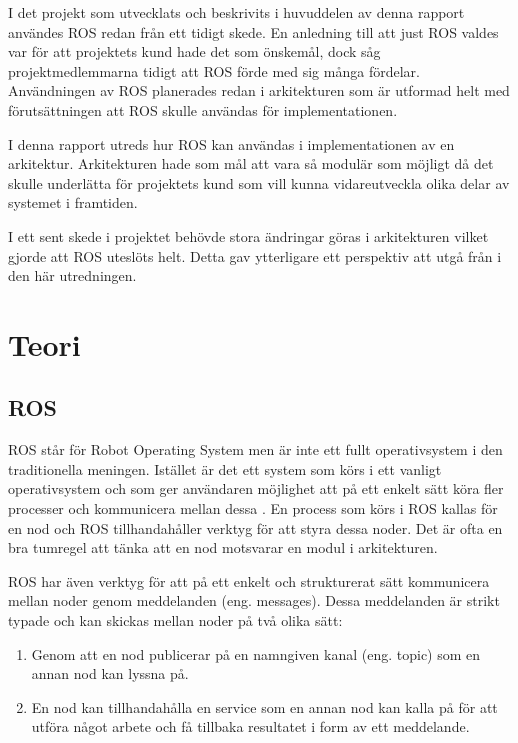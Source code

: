 I det projekt som utvecklats och beskrivits i huvuddelen av denna rapport användes ROS redan från ett tidigt skede. En anledning till att just ROS valdes var för att projektets kund hade det som önskemål, dock såg projektmedlemmarna tidigt att ROS förde med sig många fördelar. Användningen av ROS planerades redan i arkitekturen som är utformad helt med förutsättningen att ROS skulle användas för implementationen.

I denna rapport utreds hur ROS kan användas i implementationen av en arkitektur. Arkitekturen hade som mål att vara så modulär som möjligt då det skulle underlätta för projektets kund som vill kunna vidareutveckla olika delar av systemet i framtiden.

I ett sent skede i projektet behövde stora ändringar göras i arkitekturen vilket gjorde att ROS uteslöts helt. Detta gav ytterligare ett perspektiv att utgå från i den här utredningen.


\section{Teori}
\label{sec:theory-lundberg}

\subsection{ROS}
ROS står för Robot Operating System men är inte ett fullt operativsystem i den traditionella meningen. Istället är det ett system som körs i ett vanligt operativsystem och som ger användaren möjlighet att på ett enkelt sätt köra fler processer och kommunicera mellan dessa \cite{quigley2009ros}. En process som körs i ROS kallas för en nod och ROS tillhandahåller verktyg för att styra dessa noder. Det är ofta en bra tumregel att tänka att en nod motsvarar en modul i arkitekturen.

ROS har även verktyg för att på ett enkelt och strukturerat sätt kommunicera mellan noder genom meddelanden (eng. messages). Dessa meddelanden är strikt typade och kan skickas mellan noder på två olika sätt:

\begin{enumerate}
	\item Genom att en nod publicerar på en namngiven kanal (eng. topic) som en annan nod kan lyssna på.
	
	\item En nod kan tillhandahålla en service som en annan nod kan kalla på för att utföra något arbete och få tillbaka resultatet i form av ett meddelande.
\end{enumerate}

